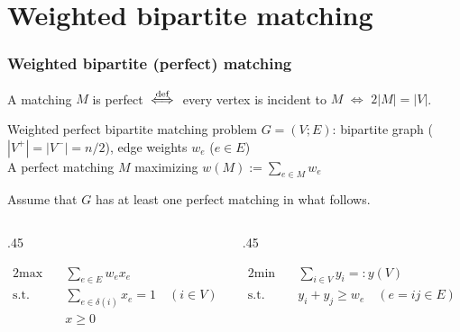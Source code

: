 \documentclass[14pt,aspectratio=169,xcolor=dvipsnames,table,onlytextwidth]{beamer}
\begin{document}
\section{Weighted bipartite matching}
\begin{frame}
    \frametitle{Weighted bipartite (perfect) matching}
    \small

    A matching $M$ is \alert{perfect} $\overset{\text{def}}{\iff}$ every vertex is incident to $M$ $\iff$ $2|M| = |V|$.

    \begin{block}{Weighted perfect bipartite matching problem}
         $G=(V; E)$: bipartite graph ($|V^+|=|V^-|=n/2$), edge weights $w_e$ ($e \in E$) \\
         A perfect matching $M$ maximizing $w(M) := \sum_{e\in M}w_e$
    \end{block}
    Assume that $G$ has at least one perfect matching in what follows.
    \pause

    \begin{columns}[T]
    \begin{column}{.45\textwidth}
    \begin{primal}
        \setlength{\abovedisplayskip}{0pt}
        \begin{alignat*}{2}
            \text{max} & \quad  \sum_{e \in E} w_e x_e \\
            \text{s.t.} & \quad \sum_{e \in \delta(i)} x_e = 1  \quad (i \in V) \\
            & \quad x \geq 0
        \end{alignat*}
    \end{primal}
    \end{column}
    \begin{column}{.45\textwidth}
    \begin{dual}
        \setlength{\abovedisplayskip}{0pt}
        \begin{alignat*}{2}
            \text{min} & \quad  \sum_{i \in V} y_i =: y(V) \\
            \text{s.t.} & \quad y_i + y_j \geq w_e \quad (e=ij \in E)
        \end{alignat*}
    \end{dual}
    \end{column}
    \end{columns}

\end{frame}
\end{document}
